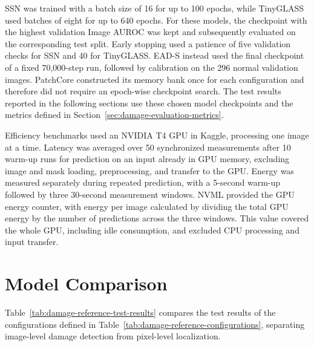 SSN was trained with a batch size of 16 for up to 100 epochs, while TinyGLASS used batches of eight for up to 640 epochs. For these models, the checkpoint with the highest validation Image AUROC was kept and subsequently evaluated on the corresponding test split. Early stopping used a patience of five validation checks for SSN and 40 for TinyGLASS. EAD-S instead used the final checkpoint of a fixed 70,000-step run, followed by calibration on the 296 normal validation images. PatchCore constructed its memory bank once for each configuration and therefore did not require an epoch-wise checkpoint search. The test results reported in the following sections use these chosen model checkpoints and the metrics defined in Section~\ref{sec:damage-evaluation-metrics}.

Efficiency benchmarks used an NVIDIA T4 GPU in Kaggle, processing one image at a time. Latency was averaged over 50 synchronized measurements after 10 warm-up runs for prediction on an input already in GPU memory, excluding image and mask loading, preprocessing, and transfer to the GPU. Energy was measured separately during repeated prediction, with a 5-second warm-up followed by three 30-second measurement windows. NVML provided the GPU energy counter, with energy per image calculated by dividing the total GPU energy by the number of predictions across the three windows. This value covered the whole GPU, including idle consumption, and excluded CPU processing and input transfer.

\section{Model Comparison}
\label{sec:damage-model-comparison}
Table~\ref{tab:damage-reference-test-results} compares the test results of the configurations defined in Table~\ref{tab:damage-reference-configurations}, separating image-level damage detection from pixel-level localization.

